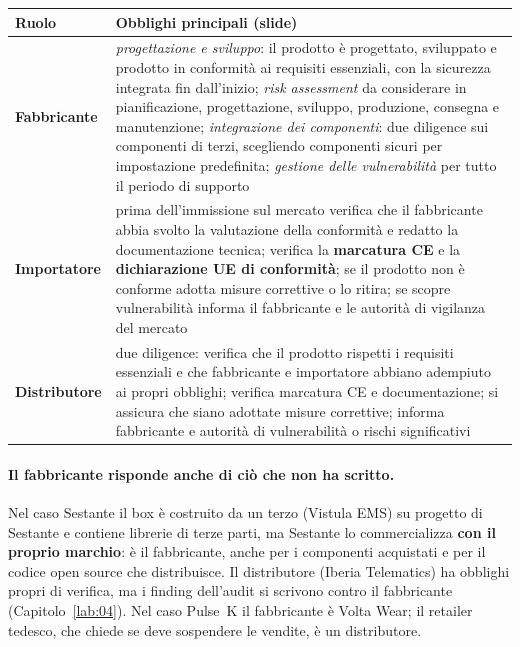 \begin{center}
\small
\begin{tabularx}{\linewidth}{>{\raggedright\arraybackslash}p{2.3cm} X}
\toprule
\textbf{Ruolo} & \textbf{Obblighi principali (slide)}\\
\midrule
\textbf{Fabbricante} & \emph{progettazione e sviluppo}: il prodotto è progettato, sviluppato e prodotto
  in conformità ai requisiti essenziali, con la sicurezza integrata fin dall'inizio; \emph{risk
  assessment} da considerare in pianificazione, progettazione, sviluppo, produzione, consegna e
  manutenzione; \emph{integrazione dei componenti}: due diligence sui componenti di terzi, scegliendo
  componenti sicuri per impostazione predefinita; \emph{gestione delle vulnerabilità} per tutto il
  periodo di supporto\\
\midrule
\textbf{Importatore} & prima dell'immissione sul mercato verifica che il fabbricante abbia svolto la
  valutazione della conformità e redatto la documentazione tecnica; verifica la \textbf{marcatura CE} e la
  \textbf{dichiarazione UE di conformità}; se il prodotto non è conforme adotta misure correttive o lo
  ritira; se scopre vulnerabilità informa il fabbricante e le autorità di vigilanza del mercato\\
\midrule
\textbf{Distributore} & due diligence: verifica che il prodotto rispetti i requisiti essenziali e che
  fabbricante e importatore abbiano adempiuto ai propri obblighi; verifica marcatura CE e documentazione;
  si assicura che siano adottate misure correttive; informa fabbricante e autorità di vulnerabilità o
  rischi significativi\\
\bottomrule
\end{tabularx}
\end{center}

\paragraph{Il fabbricante risponde anche di ciò che non ha scritto.} Nel caso Sestante il box è
costruito da un terzo (Vistula EMS) su progetto di Sestante e contiene librerie di terze parti, ma
Sestante lo commercializza \textbf{con il proprio marchio}: è il fabbricante, anche per i componenti
acquistati e per il codice open source che distribuisce. Il distributore (Iberia Telematics) ha obblighi
propri di verifica, ma i finding dell'audit si scrivono contro il fabbricante (Capitolo~\ref{lab:04}).
Nel caso Pulse~K il fabbricante è Volta Wear; il retailer tedesco, che chiede se deve sospendere le
vendite, è un distributore.

